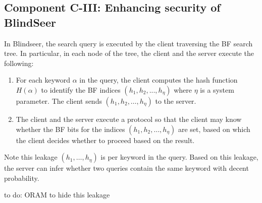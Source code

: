 \subsection{Component C-III: Enhancing security of BlindSeer}

In Blindseer, the search query is executed by the client traversing the BF
search tree. In particular, in each node of the tree, the client and the server
execute the following:

\begin{enumerate}
\item For each keyword $\alpha$ in the query, the client computes the hash
function $H(\alpha)$ to identify the BF indices $(h_1, h_2, ..., h_\eta)$ where
$\eta$ is a system parameter. The client sends $(h_1, h_2, \ldots, h_\eta)$ to
the server. 

\item The client and the server execute a protocol so that the client may know
whether the BF bits for the indices $(h_1, h_2, \ldots, h_\eta)$ are set, based
on which the client decides whether to proceed based on the result.
\end{enumerate}

Note this leakage $(h_1, \ldots, h_\eta)$ is per keyword in the query. Based on
this leakage, the server can infer whether two queries contain the same keyword
with decent probability. 


to do: ORAM to hide this leakage
